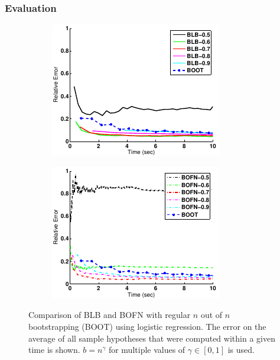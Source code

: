 \subsubsection{Evaluation}%
\label{sec:params:blb:eval}

\begin{figure}
	\begin{subfigure}{0.5\textwidth}
		\centering
		\includegraphics[width=0.9\linewidth]{gfx/blb/time1.pdf}
	\end{subfigure}
	\begin{subfigure}{0.5\textwidth}
		\centering
		\includegraphics[width=0.9\linewidth]{gfx/blb/time2.pdf}
	\end{subfigure}
	\caption{
		Comparison of BLB and BOFN with regular \(n\) out of \(n\) bootstrapping (BOOT) using logistic regression.
		The error on the average of all sample hypotheses that were computed within a given time is shown.
		\(b = n^\gamma\) for multiple values of \(\gamma \in [0, 1]\) is used.
	}\label{fig:blb:eval}
\end{figure}

